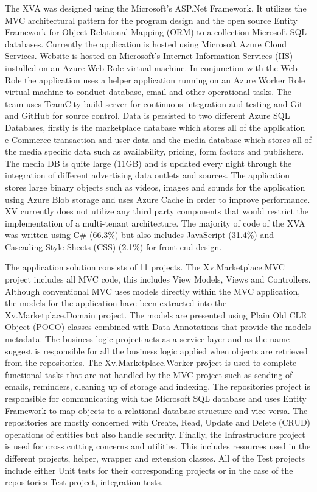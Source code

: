The XVA was designed using the Microsoft's ASP.Net Framework. It utilizes the MVC architectural pattern for the program design and the open source Entity Framework for Object Relational Mapping (ORM) to a collection Microsoft SQL databases. Currently the application is hosted using Microsoft Azure Cloud Services. Website is hosted on Microsoft's Internet Information Services (IIS) installed on an Azure Web Role virtual machine. In conjunction with the Web Role the application uses a helper application running on an Azure Worker Role virtual machine to conduct database, email and other operational tasks. The team uses TeamCity build server for continuous integration and testing and Git and GitHub for source control. Data is persisted to two different Azure SQL Databases, firstly is the marketplace database which stores all of the application e-Commerce transaction and user data and the media database which stores all of the media specific data such as availability, pricing, form factors and publishers. The media DB is quite large (11GB) and is updated every night through the integration of different advertising data outlets and sources. The application stores large binary objects such as videos, images and sounds for the application using Azure Blob storage and uses Azure Cache in order to improve performance. XV currently does not utilize any third party components that would restrict the implementation of a multi-tenant architecture. The majority of code of the XVA was written using C\# (66.3\%) but also includes JavaScript (31.4\%) and Cascading Style Sheets (CSS) (2.1\%) for front-end design.



The application solution consists of 11 projects. The Xv.Marketplace.MVC project includes all MVC code, this includes View Models, Views and Controllers. Although conventional MVC uses models directly within the MVC application, the models for the application have been extracted into the Xv.Marketplace.Domain project. The models are presented using Plain Old CLR Object (POCO) classes combined with Data Annotations that provide the models metadata. The business logic project acts as a service layer and as the name suggest is responsible for all the business logic applied when objects are retrieved from the repositories. The Xv.Marketplace.Worker project is used to complete functional tasks that are not handled by the MVC project such as sending of emails, reminders, cleaning up of storage and indexing. The repositories project is responsible for communicating with the Microsoft SQL database and uses Entity Framework to map objects to a relational database structure and vice versa. The repositories are mostly concerned with Create, Read, Update and Delete (CRUD) operations of entities but also handle security. Finally, the Infrastructure project is used for cross cutting concerns and utilities. This includes resources used in the different projects, helper, wrapper and extension classes. All of the Test projects include either Unit tests for their corresponding projects or in the case of the repositories Test project, integration tests.


